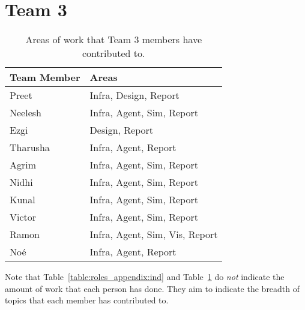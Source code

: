 \section{Team 3}
\label{sec:roles_appendix:team3}

\begin{table}[H]
    \centering
    \begin{tabular}{|l|l|}
    \hline
    \textbf{Team Member} & \textbf{Areas}     \\ \hline
    Preet  & Infra, Design, Report         \\
    Neelesh  & Infra, Agent, Sim, Report                 \\
    Ezgi     & Design, Report        \\
    Tharusha     & Infra, Agent, Report \\
    Agrim    & Infra, Agent, Sim, Report                      \\
    Nidhi  & Infra, Agent, Sim, Report                        \\
    Kunal    & Infra, Agent, Sim, Report  \\
    Victor & Infra, Agent, Sim, Report  \\ 
    Ramon &  Infra, Agent, Sim, Vis, Report \\
    Noé &   Infra, Agent, Report \\   \hline
\end{tabular}
\caption{Areas of work that Team 3 members have contributed to.}
\label{sec:roles_appendix:team1}
\end{table}



Note that Table~\ref{table:roles_appendix:ind} and Table~\ref{sec:roles_appendix:team3} do \emph{not} indicate the amount of work that each person has done. They aim to indicate the breadth of topics that each member has contributed to. 